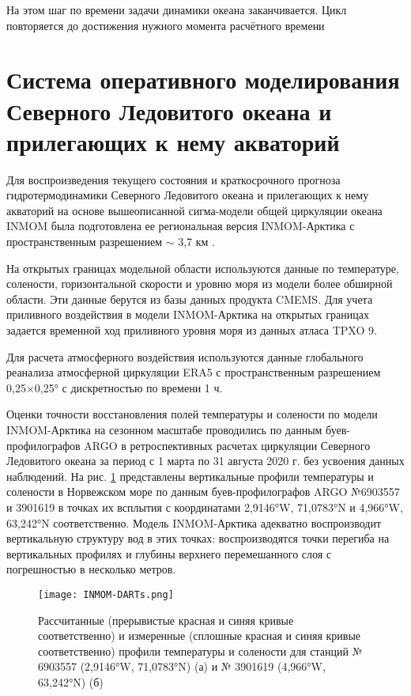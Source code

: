 На этом шаг по времени задачи динамики океана заканчивается. Цикл повторяется до достижения нужного момента расчётного времени

\section{Система оперативного моделирования Северного Ледовитого океана и прилегающих к нему акваторий}\label{sec:inmsom/ch1/sec4}

Для воспроизведения текущего состояния и краткосрочного прогноза гидротермодинамики Северного Ледовитого океана и прилегающих к нему акваторий на основе вышеописанной сигма-модели общей циркуляции океана INMOM была подготовлена ее региональная версия INMOM-Арктика с пространственным разрешением $\sim$ 3,7 км \cite{ChaplyginINMOM2021}.

На открытых границах модельной области используются данные по температуре, солености,
горизонтальной скорости и уровню моря из модели более обширной области. Эти данные берутся из базы данных продукта CMEMS. Для учета приливного воздействия в модели INMOM-Арктика на открытых границах задается временной ход приливного уровня моря из данных атласа TPXO 9. 

Для расчета атмосферного воздействия используются данные глобального реанализа атмосферной циркуляции ERA5 с пространственным разрешением 0,25×0,25° с дискретностью по времени 1 ч. 

Оценки точности восстановления полей температуры и солености по модели INMOM-Арктика на сезонном масштабе проводились по данным буев-профилографов ARGO в ретроспективных расчетах циркуляции Северного Ледовитого океана за период с 1 марта по 31 августа 2020 г. без усвоения данных наблюдений.
На рис. \ref{fig:INMOM-DARTs} представлены вертикальные профили температуры и солености в Норвежском море по данным буев-профилографов ARGO №6903557 и 3901619 в точках их всплытия с координатами 2,9146°W, 71,0783°N и 4,966°W, 63,242°N соответственно. Модель INMOM-Арктика адекватно воспроизводит вертикальную структуру вод в этих точках: воспроизводятся точки перегиба на вертикальных профилях и глубины верхнего перемешанного слоя с погрешностью в несколько метров.

\begin{figure}[htb!]
	\center
	\texttt{[image: INMOM-DARTs.png]}
	\caption{Рассчитанные (прерывистые красная и синяя кривые соответственно) и измеренные (сплошные красная и синяя кривые соответственно) профили температуры и солености для станций № 6903557 (2,9146°W, 71,0783°N) (а) и № 3901619 (4,966°W, 63,242°N) (б)}
	\label{fig:INMOM-DARTs}
\end{figure}


